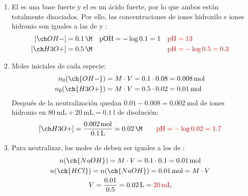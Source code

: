 \begin{exerciseEVAU}
\begin{solu}
        \begin{enumerate}[label=\letraminuscula]
            \item El  es una base fuerte y el  es un ácido fuerte, por lo que ambos están totalmente disociados. Por ello, las concentraciones de iones hidroxilo e iones hidronio son iguales a las de  y :
            \begin{align*}
                \conc{OH-}  &= \num{0.1}\,\unit{\M} & \mathrm{pOH} &= -\log \num{0.1} = 1 & & \textcolor{red}{\mathrm{pH} = 13} \\
                \conc{H3O+} &= \num{0.5}\,\unit{\M} &              &                      & & \textcolor{red}{\mathrm{pH} = -\log \num{0.5} = \num{0.3}}
            \end{align*}

            \item Moles iniciales de cada especie:
            \begin{align*}
                n_0(\ch{OH-})  &= M \cdot V = \num{0.1} \cdot \num{0.08} = \qty{0.008}{\mol} \\
                n_0(\ch{H3O+}) &= M \cdot V = \num{0.5} \cdot \num{0.02} = \qty{0.01}{\mol}
            \end{align*}
            Después de la neutralización quedan \(\num{0.01} - \num{0.008} = \qty{0.002}{\mol}\) de iones hidronio en \(\qty{80}{\mL} + \qty{20}{\mL} = \qty{0.1}{\litre}\) de disolución:
            \[
                \conc{H3O+} = \frac{\qty{0.002}{\mol}}{\qty{0.1}{\litre}} = \qty{0.02}{\M} \qquad \textcolor{red}{\mathrm{pH} = -\log \num{0.02} = \num{1.7}}
            \]

            \item Para neutralizar, los moles de  deben ser iguales a los de :
            \begin{gather*}
                n(\ch{NaOH}) = M \cdot V = \num{0.1} \cdot \num{0.1} = \qty{0.01}{\mol} \\
                n(\ch{HCl}) = n(\ch{NaOH}) = \qty{0.01}{\mol} = M \cdot V \\
                V = \frac{\num{0.01}}{\num{0.5}} = \qty{0.02}{\litre} = \textcolor{red}{\qty{20}{\mL}}
            \end{gather*}
        \end{enumerate}

    \end{solu}

\end{exerciseEVAU}

